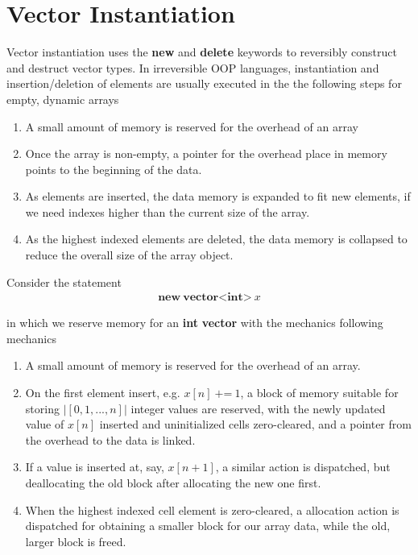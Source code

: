 \section{Vector Instantiation}
\label{sec:vector-instatiation}
Vector instantiation uses the \textbf{new} and \textbf{delete} keywords to reversibly construct and destruct vector types. In irreversible OOP languages,  instantiation and insertion/deletion of elements are usually executed in the the following steps for empty, dynamic arrays

\begin{enumerate}
\item A small amount of memory is reserved for the overhead of an array
\item Once the array is non-empty, a pointer for the overhead place in memory points to the beginning of the data.
\item As elements are inserted, the data memory is expanded to fit new elements, if we need indexes higher than the current size of the array.
\item As the highest indexed elements are deleted, the data memory is collapsed to reduce the overall size of the array object.
\end{enumerate}

Consider the statement
\begin{align*}
\textbf{new}\ \textbf{vector}\texttt{<}\textbf{int}\texttt{>}\ x
\end{align*} 

in which we reserve memory for an \textbf{int} \textbf{vector} with the mechanics following mechanics

\begin{enumerate}
\item A small amount of memory is reserved for the overhead of an array.
\item On the first element insert, e.g. $x[n]\ \texttt{+=}\ 1$, a block of memory suitable for storing $|[0, 1, ..., n]|$ integer values are reserved, with the newly updated value of $x[n]$ inserted and uninitialized cells zero-cleared, and a pointer from the overhead to the data is linked.
\item If a value is inserted at, say, $x[n+1]$, a similar action is dispatched, but deallocating the old block after allocating the new one first.
\item When the highest indexed cell element is zero-cleared, a allocation action is dispatched for obtaining a smaller block for our array data, while the old, larger block is freed.
\end{enumerate}

